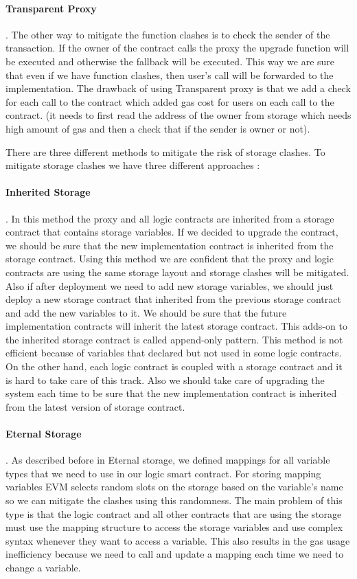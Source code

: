 \paragraph{Transparent Proxy}. 
The other way to mitigate the function clashes is to check the sender of the transaction. If the owner of the contract calls the proxy the upgrade function will be executed and otherwise the fallback will be executed. This way we are sure that even if we have function clashes, then user's call will be forwarded to the implementation. 
The drawback of using Transparent proxy is that we add a check for each call to the contract which added gas cost for users on each call to the contract. (it needs to first read the address of the owner from storage which needs high amount of gas and then a check that if the sender is owner or not). 


There are three different methods to mitigate the risk of storage clashes.  To mitigate storage clashes we have three different approaches :

\paragraph{Inherited Storage}. 
In this method the proxy and all logic contracts are inherited from a storage contract that contains storage variables. If we decided to upgrade the contract, we should be sure that the new implementation contract is inherited from the storage contract. Using this method we are confident that the proxy and logic contracts are using the same storage layout and storage clashes will be mitigated.
Also if after deployment we need to add new storage variables, we should just deploy a new storage contract that inherited from the previous storage contract and add the new variables to it. We should be sure that the future implementation contracts will inherit the latest storage contract. This adds-on to the inherited storage contract is called append-only pattern.
This method is not efficient because of variables that declared but not used in some logic contracts. On the other hand, each logic contract is coupled with a storage contract and it is hard to take care of this track. Also we should take care of upgrading the system each time to be sure that the new implementation contract is inherited from the latest version of storage contract.

\paragraph{Eternal Storage}. 
As described before in Eternal storage, we defined mappings for all variable types that we need to use in our logic smart contract. For storing mapping variables EVM selects random slots on the storage based on the variable's name so we can mitigate the clashes using this randomness.
The main problem of this type is that the logic contract and all other contracts that are using the storage must use the mapping structure to access the storage variables and use complex syntax whenever they want to access a variable. This also results in the gas usage inefficiency because we need to call and update a mapping each time we need to change a variable.  


